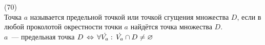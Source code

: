 (70)\\
Точка $a$ называется предельной точкой или точкой сгущения множества $D$, если в любой проколотой окрестности точки $a$ найдётся точка множества $D$.\\
$a$~--- предельная точка $D\, \Leftrightarrow \,\forall \dot{V_a}:\, \dot{V_a} \cap D \neq \varnothing$